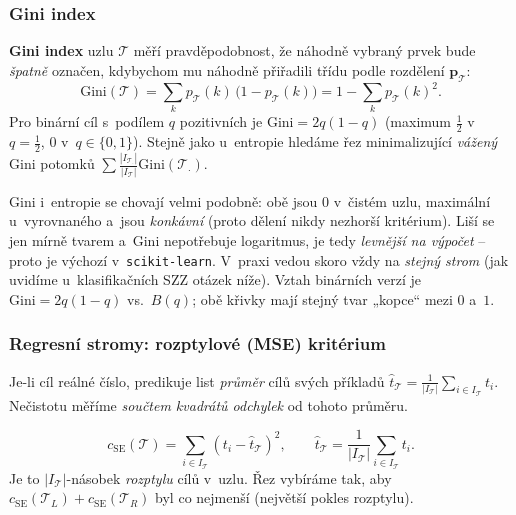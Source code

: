 \subsubsection*{Gini index}

\begin{definice}
\textbf{Gini index} uzlu $\mathcal{T}$ měří pravděpodobnost, že náhodně vybraný prvek bude \emph{špatně} označen, kdybychom mu náhodně přiřadili třídu podle rozdělení $\mathbf{p}_{\mathcal{T}}$:
\[ \mathrm{Gini}(\mathcal{T}) = \sum_k p_{\mathcal{T}}(k)\,\big(1-p_{\mathcal{T}}(k)\big) = 1 - \sum_k p_{\mathcal{T}}(k)^2. \]
Pro binární cíl s~podílem $q$ pozitivních je $\mathrm{Gini}=2q(1-q)$ (maximum $\tfrac12$ v~$q=\tfrac12$, $0$ v~$q\in\{0,1\}$). Stejně jako u~entropie hledáme řez minimalizující \emph{vážený} Gini potomků $\sum \tfrac{|I_{\mathcal{T}_\cdot}|}{|I_{\mathcal{T}}|}\mathrm{Gini}(\mathcal{T}_\cdot)$.
\end{definice}

\begin{intuice}
Gini i~entropie se chovají velmi podobně: obě jsou $0$ v~čistém uzlu, maximální u~vyrovnaného a~jsou \emph{konkávní} (proto dělení nikdy nezhorší kritérium). Liší se jen mírně tvarem a~Gini nepotřebuje logaritmus, je tedy \emph{levnější na výpočet} -- proto je výchozí v~\texttt{scikit-learn}. V~praxi vedou skoro vždy na \emph{stejný strom} (jak uvidíme u~klasifikačních SZZ otázek níže). Vztah binárních verzí je $\mathrm{Gini}=2q(1-q)$ vs.\ $B(q)$; obě křivky mají stejný tvar „kopce`` mezi $0$ a~$1$.
\end{intuice}

\subsubsection*{Regresní stromy: rozptylové (MSE) kritérium}

Je-li cíl reálné číslo, predikuje list \emph{průměr} cílů svých příkladů $\hat t_{\mathcal{T}}=\tfrac{1}{|I_{\mathcal{T}}|}\sum_{i\in I_{\mathcal{T}}} t_i$. Nečistotu měříme \emph{součtem kvadrátů odchylek} od tohoto průměru.

\begin{definice}
\[ c_{\mathrm{SE}}(\mathcal{T}) = \sum_{i\in I_{\mathcal{T}}} (t_i - \hat t_{\mathcal{T}})^2,\qquad \hat t_{\mathcal{T}} = \frac{1}{|I_{\mathcal{T}}|}\sum_{i\in I_{\mathcal{T}}} t_i. \]
Je to $|I_{\mathcal{T}}|$-násobek \emph{rozptylu} cílů v~uzlu. Řez vybíráme tak, aby $c_{\mathrm{SE}}(\mathcal{T}_L)+c_{\mathrm{SE}}(\mathcal{T}_R)$ byl co nejmenší (největší pokles rozptylu).
\end{definice}

